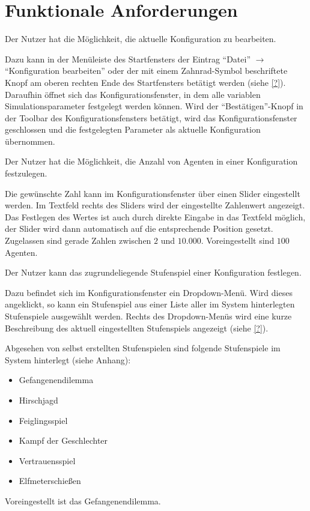 \documentclass[parskip=full,11pt]{scrartcl}
\begin{document}
\section{Funktionale Anforderungen}

Der Nutzer hat die Möglichkeit, die aktuelle Konfiguration zu bearbeiten.

Dazu kann in der Menüleiste des Startfensters der Eintrag \enquote{Datei} \(\rightarrow\) \enquote{Konfiguration bearbeiten} oder der mit einem Zahnrad-Symbol beschriftete Knopf am oberen rechten Ende des Startfensters betätigt werden (siehe \cref{?}). Daraufhin öffnet sich das Konfigurationsfenster, in dem alle variablen Simulationsparameter festgelegt werden können. Wird der \enquote{Bestätigen}-Knopf in der Toolbar des Konfigurationsfensters betätigt, wird das Konfigurationsfenster geschlossen und die festgelegten Parameter als aktuelle Konfiguration übernommen.

Der Nutzer hat die Möglichkeit, die Anzahl von Agenten in einer Konfiguration festzulegen.

Die gewünschte Zahl kann im Konfigurationsfenster über einen Slider eingestellt werden. Im Textfeld rechts des Sliders wird der eingestellte Zahlenwert angezeigt. Das Festlegen des Wertes ist auch durch direkte Eingabe in das Textfeld möglich, der Slider wird dann automatisch auf die entsprechende Position gesetzt. Zugelassen sind gerade Zahlen zwischen \(2\) und \(10.000\). Voreingestellt sind \(100\) Agenten.

Der Nutzer kann das zugrundeliegende Stufenspiel einer Konfiguration festlegen.

Dazu befindet sich im Konfigurationsfenster ein Dropdown-Menü. Wird dieses angeklickt, so kann ein Stufenspiel aus einer Liste aller im System hinterlegten Stufenspiele ausgewählt werden. Rechts des Dropdown-Menüs wird eine kurze Beschreibung des aktuell eingestellten Stufenspiels angezeigt (siehe \cref{?}).

Abgesehen von selbst erstellten Stufenspielen sind folgende Stufenspiele im System hinterlegt (siehe Anhang):
\begin{itemize} \itemsep -10pt
\item Gefangenendilemma
\item Hirschjagd
\item Feiglingsspiel
\item Kampf der Geschlechter
\item Vertrauensspiel
\item Elfmeterschießen
\end{itemize}
Voreingestellt ist das Gefangenendilemma.
\end{document}

